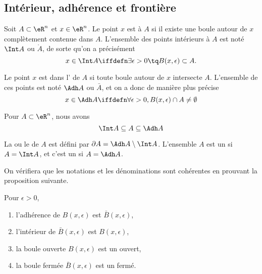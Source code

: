 					\subsection{Intérieur, adhérence et frontière}

\begin{definition}
  Soit $A \subset \eR^n$ et $x \in \eR^n$. Le point $x$ est  à $A$ si il existe une boule autour de $x$ complètement contenue dans $A$. L'ensemble des points intérieurs à $A$ est noté $\Int A$ ou $\mathring A$, de sorte qu'on a précisément
  \begin{equation*}
    x \in \Int A \iffdefn  \exists \epsilon > 0 \tq
    B(x,\epsilon) \subset A.
  \end{equation*}
\end{definition}


\begin{definition}
Le point $x$ est dans l' de $A$ si toute boule autour de $x$ intersecte $A$. L'ensemble de ces points est noté $\Adh A$ ou $\bar A$, et on a donc de manière plus précise
\begin{equation}
	x \in \Adh A \iffdefn \forall \epsilon > 0, B(x,\epsilon) \cap A \neq \emptyset
\end{equation}
\end{definition}

\begin{proposition}
Pour $A \subset \eR^n$, nous avons
\begin{equation*}
	\Int A \subseteq A  \subseteq \Adh A
\end{equation*}
\end{proposition}

\begin{definition}
  La  ou le  de $A$ est défini par $\partial A = \Adh A \setminus \Int A$. L'ensemble $A$ est un  si $A = \Int A$, et c'est un  si $A = \Adh A$.
\end{definition}

On vérifiera que les notations et les dénominations sont cohérentes en
prouvant la proposition suivante.
\begin{proposition}Pour $\epsilon > 0$,
  \begin{enumerate}
  \item l'adhérence de $B(x,\epsilon)$ est $\bar B(x,\epsilon)$,
  \item l'intérieur de $\bar B(x,\epsilon)$ est $B(x,\epsilon)$,
  \item la boule ouverte $B(x,\epsilon)$ est un ouvert,
  \item la boule fermée $\bar B(x,\epsilon)$ est un fermé.
  \end{enumerate}
\end{proposition}

